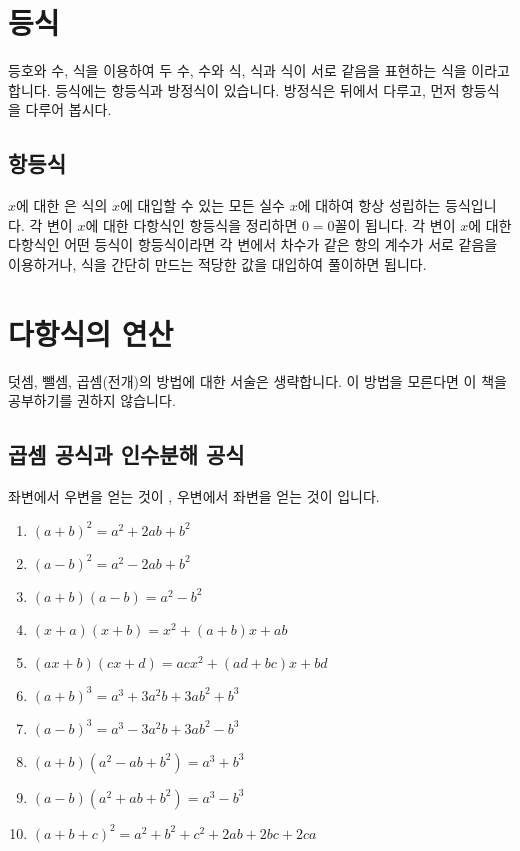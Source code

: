 \section{등식}
등호와 수, 식을 이용하여 두 수, 수와 식, 식과 식이 서로 같음을 표현하는 식을 이라고 합니다. 등식에는 항등식과 방정식이 있습니다. 방정식은 뒤에서 다루고, 먼저 항등식을 다루어 봅시다.
\subsection{항등식}
$x$에 대한 은 식의 $x$에 대입할 수 있는 모든 실수 $x$에 대하여 항상 성립하는 등식입니다. 각 변이 $x$에 대한 다항식인 항등식을 정리하면 $0 = 0$꼴이 됩니다. 각 변이 $x$에 대한 다항식인 어떤 등식이 항등식이라면 각 변에서 차수가 같은 항의 계수가 서로 같음을 이용하거나, 식을 간단히 만드는 적당한 값을 대입하여 풀이하면 됩니다.


\section{다항식의 연산}
덧셈, 뺄셈, 곱셈(전개)의 방법에 대한 서술은 생략합니다. 이 방법을 모른다면 이 책을 공부하기를 권하지 않습니다.

\subsection{곱셈 공식과 인수분해 공식}
좌변에서 우변을 얻는 것이 , 우변에서 좌변을 얻는 것이 입니다.

\begin{enumerate}[label=\onum*]
    \item $(a+b)^2 = a^2 + 2ab + b^2$

    \item $(a-b)^2 = a^2 - 2ab + b^2$
    \item $(a+b)(a-b) = a^2 - b^2$
    \item $(x+a)(x+b)=x^2 + (a+b)x+ab$
    \item $(ax+b)(cx+d)=acx^2 + (ad+bc)x + bd$
    \item $(a+b)^3 = a^3 + 3a^2b + 3ab^2 + b^3$
    \item $(a-b)^3 = a^3 - 3a^2b + 3ab^2 - b^3$
    \item $(a+b)(a^2-ab+b^2) = a^3  + b^3$
    \item $(a-b)(a^2+ab+b^2)=a^3 - b^3$
    \item $(a+b+c)^2 = a^2 + b^2 + c^2 + 2ab + 2bc + 2ca$
\end{enumerate}\cleartorecto

